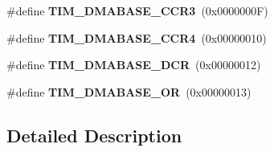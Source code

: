 \begin{DoxyCompactItemize}
\item 
\hypertarget{group___t_i_m___d_m_a___base__address_gae3c259f405c78e31411c19195eac48bc}{\#define {\bfseries T\-I\-M\-\_\-\-D\-M\-A\-B\-A\-S\-E\-\_\-\-C\-C\-R3}~(0x0000000\-F)}\label{group___t_i_m___d_m_a___base__address_gae3c259f405c78e31411c19195eac48bc}

\item 
\hypertarget{group___t_i_m___d_m_a___base__address_gaea24fd3f528163da065cbdce3c68ef23}{\#define {\bfseries T\-I\-M\-\_\-\-D\-M\-A\-B\-A\-S\-E\-\_\-\-C\-C\-R4}~(0x00000010)}\label{group___t_i_m___d_m_a___base__address_gaea24fd3f528163da065cbdce3c68ef23}

\item 
\hypertarget{group___t_i_m___d_m_a___base__address_gab3e5aaf0cb815b4a2469d3046eca0201}{\#define {\bfseries T\-I\-M\-\_\-\-D\-M\-A\-B\-A\-S\-E\-\_\-\-D\-C\-R}~(0x00000012)}\label{group___t_i_m___d_m_a___base__address_gab3e5aaf0cb815b4a2469d3046eca0201}

\item 
\hypertarget{group___t_i_m___d_m_a___base__address_ga4b50ac8b63d27e309695ba36643bc1d0}{\#define {\bfseries T\-I\-M\-\_\-\-D\-M\-A\-B\-A\-S\-E\-\_\-\-O\-R}~(0x00000013)}\label{group___t_i_m___d_m_a___base__address_ga4b50ac8b63d27e309695ba36643bc1d0}

\end{DoxyCompactItemize}


\subsection{Detailed Description}
